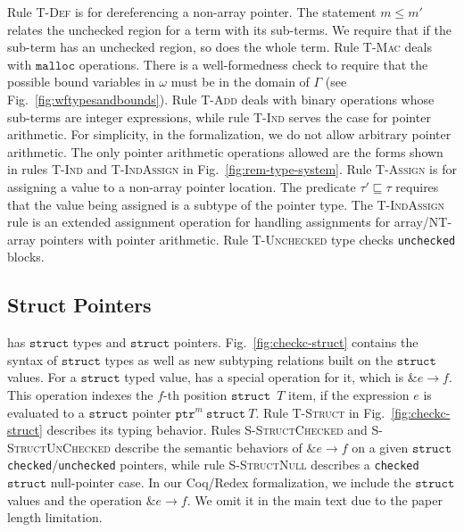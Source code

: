 \documentclass[conference]{IEEEtran}
\newcommand{\code}[1]{\lstinline|#1|}
\newcommand{\checkedc}{\text{Checked C}\xspace}
\newcommand{\kw}[1]{\ensuremath{\mathtt{#1}}}
\newcommand{\tptr}[2]{\ensuremath{\mathtt{ptr}^{#2}~{#1}}}
\newcommand{\tstruct}[1]{\ensuremath{\kw{struct}~{#1}}}
\newcommand{\emalloctext}{\ensuremath{\kw{malloc}}}
\newcommand{\eamper}[2]{\ensuremath{\kw{\&}{#1}\kw{\rightarrow}{#2}}}
\begin{document}
Rule \textsc{T-Def} is for dereferencing a non-array pointer. 
The statement $m \leq m'$ relates the unchecked region for a term with
its sub-terms. We require that if the sub-term has an unchecked
region, so does the whole term. Rule \textsc{T-Mac} deals with
$\emalloctext$ operations. There is a well-formedness check to require
that the possible bound variables in $\omega$ must be in the domain of
$\Gamma$ (see Fig.~\ref{fig:wftypesandbounds}). Rule \textsc{T-Add} deals with binary operations whose sub-terms are integer expressions, while rule \textsc{T-Ind} serves the case for pointer arithmetic. For simplicity, in the \checkedc formalization, we do not allow arbitrary pointer arithmetic. The only pointer arithmetic operations allowed are the forms shown in rules \textsc{T-Ind} and \textsc{T-IndAssign} in Fig.~\ref{fig:rem-type-system}. Rule \textsc{T-Assign} is for assigning a value to a non-array pointer location. The predicate $\tau'\sqsubseteq \tau$ requires that the value being assigned is a subtype of the pointer type.
The \textsc{T-IndAssign} rule is an extended assignment operation for handling assignments for array/NT-array pointers with pointer arithmetic. Rule \textsc{T-Unchecked} type checks \code{unchecked} blocks.

\subsection{Struct Pointers}\label{appx:struct}

\checkedc has \kw{struct} types and \kw{struct} pointers. Fig.~\ref{fig:checkc-struct} contains the syntax of \kw{struct} types as well as new subtyping relations built on the \kw{struct} values.
For a \kw{struct} typed value, \checkedc has a special operation for it, which is $\eamper{e}{f}$. This operation indexes the $f$-th position \kw{struct}~$T$ item, if the expression $e$ is evaluated to a \kw{struct} pointer $\tptr{\tstruct{T}}{m}$. Rule \textsc{T-Struct} in Fig.~\ref{fig:checkc-struct} describes its typing behavior.
Rules \textsc{S-StructChecked} and \textsc{S-StructUnChecked} describe the semantic behaviors of $\eamper{e}{f}$ on a given \kw{struct} \code{checked}/\code{unchecked} pointers, while rule \textsc{S-StructNull} describes a \code{checked} \kw{struct} null-pointer case.
In our Coq/Redex formalization, we include the \kw{struct} values and the operation $\eamper{e}{f}$. We omit it in the main text due to the paper length limitation.
\end{document}

